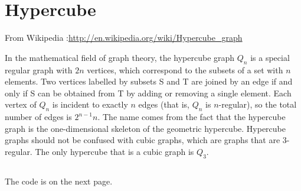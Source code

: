 \newpage\section{Hypercube}
From Wikipedia :\url{http://en.wikipedia.org/wiki/Hypercube_graph}

In the mathematical field of graph theory, the hypercube graph $Q_n$ is a  special regular graph with $2n$ vertices, which correspond to the subsets of a set with $n$ elements. Two vertices labelled by subsets S and T are joined by an edge if and only if S can be obtained from T by adding or removing a single element. Each vertex of $Q_n$ is incident to exactly $n$ edges (that is, $Q_n$ is $n$-regular), so the total number of edges is $2^{n-1}n$.
The name comes from the fact that the hypercube graph is the one-dimensional skeleton of the geometric hypercube.
Hypercube graphs should not be confused with cubic graphs, which are graphs that are 3-regular. The only hypercube that is a cubic graph is $Q_3$.

\SetVertexNoLabel

\subsection{ }

The code is on the next page.

\begin{center}
\begin{tkzexample}[vbox]
\end{tkzexample}
\end{center}
\endinput